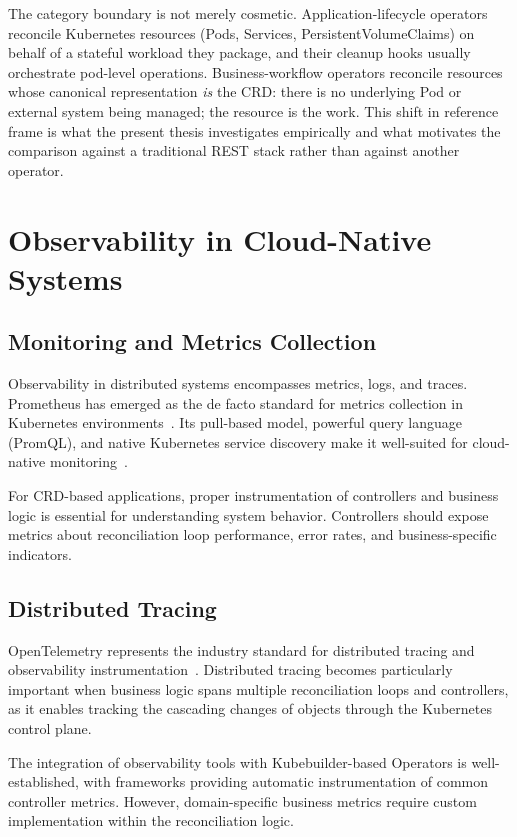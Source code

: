 The category boundary is not merely cosmetic. Application-lifecycle operators reconcile Kubernetes resources (Pods, Services, PersistentVolumeClaims) on behalf of a stateful workload they package, and their cleanup hooks usually orchestrate pod-level operations. Business-workflow operators reconcile resources whose canonical representation \emph{is} the CRD: there is no underlying Pod or external system being managed; the resource is the work. This shift in reference frame is what the present thesis investigates empirically and what motivates the comparison against a traditional REST stack rather than against another operator.

\section{Observability in Cloud-Native Systems}

\subsection{Monitoring and Metrics Collection}

Observability in distributed systems encompasses metrics, logs, and traces. Prometheus has emerged as the de facto standard for metrics collection in Kubernetes environments~\cite{prometheus, prometheus_cloud_native_monitoring}. Its pull-based model, powerful query language (PromQL), and native Kubernetes service discovery make it well-suited for cloud-native monitoring~\cite{hpc_monitoring_kubernetes_prometheus}.

For CRD-based applications, proper instrumentation of controllers and business logic is essential for understanding system behavior. Controllers should expose metrics about reconciliation loop performance, error rates, and business-specific indicators.

\subsection{Distributed Tracing}

OpenTelemetry represents the industry standard for distributed tracing and observability instrumentation~\cite{opentelemetry}. Distributed tracing becomes particularly important when business logic spans multiple reconciliation loops and controllers, as it enables tracking the cascading changes of objects through the Kubernetes control plane.

The integration of observability tools with Kubebuilder-based Operators is well-established, with frameworks providing automatic instrumentation of common controller metrics. However, domain-specific business metrics require custom implementation within the reconciliation logic.


